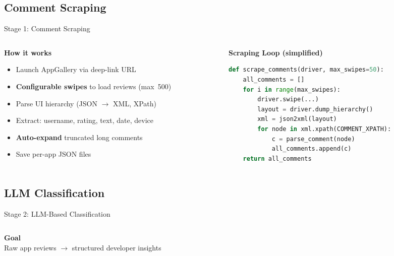 \documentclass[11pt,aspectratio=169]{beamer}
\begin{document}
\begin{CJK*}{UTF8}{gbsn}
\subsection{Comment Scraping}

\begin{frame}[fragile]{Stage 1: Comment Scraping}
  \begin{columns}[T]
    \begin{column}{0.48\textwidth}
      \textbf{How it works}
      \begin{itemize}
        \item Launch AppGallery via deep-link URL
        \item \textbf{Configurable swipes} to load reviews (max~500)
        \item Parse UI hierarchy (JSON $\rightarrow$ XML, XPath)
        \item Extract: username, rating, text, date, device
        \item \textbf{Auto-expand} truncated long comments
        \item Save per-app JSON files
      \end{itemize}
    \end{column}
    \begin{column}{0.52\textwidth}
      \textbf{Scraping Loop (simplified)}
      \begin{lstlisting}[language=Python, xleftmargin=1.5em, xleftmargin=1.5em]
def scrape_comments(driver, max_swipes=50):
    all_comments = []
    for i in range(max_swipes):
        driver.swipe(...)
        layout = driver.dump_hierarchy()
        xml = json2xml(layout)
        for node in xml.xpath(COMMENT_XPATH):
            c = parse_comment(node)
            all_comments.append(c)
    return all_comments
      \end{lstlisting}
    \end{column}
  \end{columns}
\end{frame}

\subsection{LLM Classification}

\begin{frame}{Stage 2: LLM-Based Classification}
  \scriptsize
  \begin{columns}[T]
    \begin{column}{0.45\textwidth}
      \textbf{Goal}\\
      Raw app reviews $\rightarrow$ structured developer insights


\end{column}
\end{columns}
\end{frame}
\end{CJK*}
\end{document}
